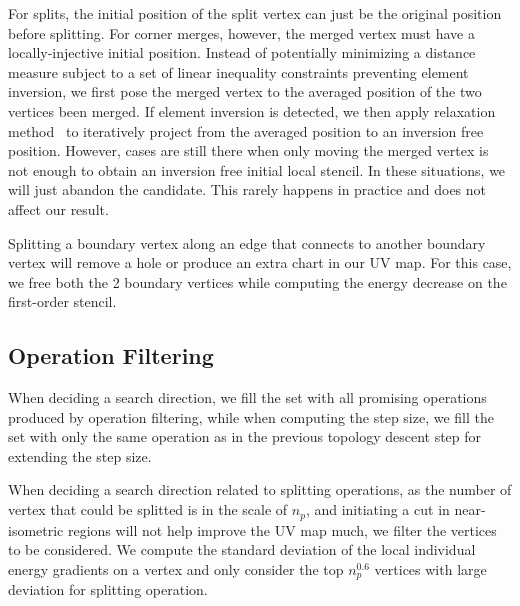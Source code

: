 For splits, the initial position of the split vertex can just be the original position before splitting. For corner merges, however, the merged vertex must have a locally-injective initial position. Instead of potentially minimizing a distance measure subject to a set of linear inequality constraints preventing element inversion, we first pose the merged vertex to the averaged position of the two vertices been merged. If element inversion is detected, we then apply relaxation method~\cite{Agmon1954Relaxation} to iteratively project from the averaged position to an inversion free position. However, cases are still there when only moving the merged vertex is not enough to obtain an inversion free initial local stencil. In these situations, we will just abandon the candidate. This rarely happens in practice and does not affect our result.

Splitting a boundary vertex along an edge that connects to another boundary vertex will remove a hole or produce an extra chart in our UV map. For this case, we free both the 2 boundary vertices while computing the energy decrease on the first-order stencil. 


\subsection{Operation Filtering}
\label{sec:operationFiltering}

When deciding a search direction, we fill the set with all promising operations produced by operation filtering, while when computing the step size, we fill the set with only the same operation as in the previous topology descent step for extending the step size.

When deciding a search direction related to splitting operations, as the number of vertex that could be splitted is in the scale of $n_p$, and initiating a cut in near-isometric regions will not help improve the UV map much, we filter the vertices to be considered. We compute the standard deviation of the local individual energy gradients on a vertex and only consider the top $n_p^{0.6}$ vertices with large deviation for splitting operation. 


